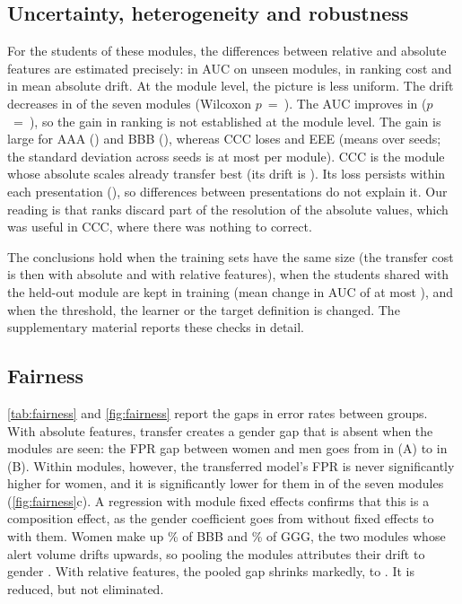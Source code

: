 \documentclass[journal]{IEEEtran}
\newcommand{\cA}{(A)}
\newcommand{\cB}{(B)}
\begin{document}
\subsection{Uncertainty, heterogeneity and robustness}
\label{sec:uncertainty}
\label{sec:robust}
For the students of these modules, the differences between relative and absolute features are estimated precisely: \resCIDiffAucB{} \resCIDiffAucBCI{} in AUC on unseen modules, \resCIDiffCost{} \resCIDiffCostCI{} in ranking cost and \resCIDiffDrift{} \resCIDiffDriftCI{} in mean absolute drift. At the module level, the picture is less uniform. The drift decreases in \resNImprovedDrift{} of the seven modules (Wilcoxon $p$~=~\resWilcoxonDrift). The AUC improves in \resNImprovedAuc{} ($p$~=~\resWilcoxonAuc), so the gain in ranking is not established at the module level. The gain is large for AAA (\resRelMinusAbsAAA) and BBB (\resRelMinusAbsBBB), whereas CCC loses \resRelMinusAbsCCC{} and EEE \resRelMinusAbsEEE{} (means over \resNSeeds{} seeds; the standard deviation across seeds is at most \resSeedSdAucMax{} per module). CCC is the module whose absolute scales already transfer best (its drift is \resCCCDriftAbs). Its loss persists within each presentation (\resCCCIntraDiff), so differences between presentations do not explain it. Our reading is that ranks discard part of the resolution of the absolute values, which was useful in CCC, where there was nothing to correct.

The conclusions hold when the training sets have the same size (the transfer cost is then \resSizeCostAbs{} with absolute and \resSizeCostRel{} with relative features), when the students shared with the held-out module are kept in training (mean change in AUC of at most \resOverlapMeanDiffMax), and when the threshold, the learner or the target definition is changed. The supplementary material reports these checks in detail.

\subsection{Fairness}
\label{sec:fairness}
\cref{tab:fairness} and \cref{fig:fairness} report the gaps in error rates between groups. With absolute features, transfer creates a gender gap that is absent when the modules are seen: the FPR gap between women and men goes from \resFprGenderAbsA{} \resFprGenderAbsACI{} in \cA{} to \resFprGenderAbsB{} \resFprGenderAbsBCI{} in \cB. Within modules, however, the transferred model's FPR is never significantly higher for women, and it is significantly lower for them in \resNGenderWithinNeg{} of the seven modules (\cref{fig:fairness}c). A regression with module fixed effects confirms that this is a composition effect, as the gender coefficient goes from \resFeGlobalAbsB{} without fixed effects to \resFeFixedAbsB{} \resFeFixedAbsBCI{} with them. Women make up \resShareFemaleBBB\% of BBB and \resShareFemaleGGG\% of GGG, the two modules whose alert volume drifts upwards, so pooling the modules attributes their drift to gender \cite{simpson1951}. With relative features, the pooled gap shrinks markedly, to \resFprGenderRelB{} \resFprGenderRelBCI. It is reduced, but not eliminated.
\end{document}
